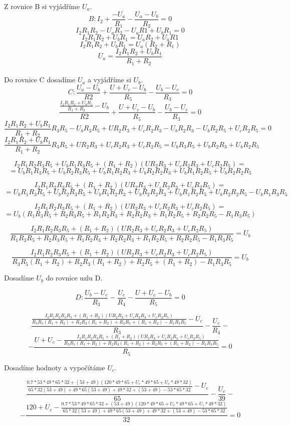 \documentclass[a4paper, 12pt]{article}
\begin{document}
\newpage
Z rovnice B si vyjádříme $U_a$.
$$ B: I_2 + \frac{-U_a}{R_1} - \frac{U_a -U_b}{R_2} = 0 $$
$$ I_2R_1R_2 - U_aR_2 -U_aR1 + U_bR_1 = 0 $$
$$ I_2R_1R_2 + U_bR_1 = U_aR_2 +U_aR1 $$
$$ I_2R_1R_2 + U_bR_1 = U_a(R_2 +R_1) $$
$$ U_a = \frac{I_2R_1R_2 + U_bR_1}{R_1 + R_2} $$
\\
Do rovnice C dosadíme $U_a$ a vyjádříme si $U_b$.
$$ C: \frac{U_a - U_b}{R2} +\frac{U+U_c-U_b}{R_5} - \frac{U_b-U_c}{R_3} = 0 $$
$$ \frac{\frac{I_2R_1R_2 + U_bR_1}{R_1 + R_2} - U_b}{R2} +\frac{U+U_c-U_b}{R_5} - \frac{U_b-U_c}{R_3} = 0 $$
$$ \frac{I_2R_1R_2 + U_bR_1}{R_1 + R_2}R_3R_5 - U_bR_3R_5 +UR_2R_3 + U_cR_2R_3 - U_bR_2R_3 - U_bR_2R_5 + U_cR_2R_5 = 0 $$
$$ \frac{I_2R_1R_2 + U_bR_1}{R_1 + R_2}R_3R_5 +UR_2R_3 + U_cR_2R_3 + U_cR_2R_5 = U_bR_3R_5 + U_bR_2R_3 + U_bR_2R_5 $$

$$ I_2R_1R_2R_3R_5 + U_bR_1R_3R_5 + (R_1 + R_2)(UR_2R_3 + U_cR_2R_3 + U_cR_2R_5) = $$
$$ = U_bR_1R_3R_5 + U_bR_2R_3R_5 + U_bR_1R_2R_3 + U_bR_2R_2R_3 + U_bR_1R_2R_5 + U_bR_2R_2R_5 $$

$$ I_2R_1R_2R_3R_5 + (R_1 + R_2)(UR_2R_3 + U_cR_2R_3 + U_cR_2R_5) = $$
$$ = U_bR_1R_3R_5 + U_bR_2R_3R_5 + U_bR_1R_2R_3 + U_bR_2R_2R_3 + U_bR_1R_2R_5 + U_bR_2R_2R_5 -U_bR_1R_3R_5 $$

$$ I_2R_1R_2R_3R_5 + (R_1 + R_2)(UR_2R_3 + U_cR_2R_3 + U_cR_2R_5) = $$
$$ = U_b (R_1R_3R_5 + R_2R_3R_5 + R_1R_2R_3 + R_2R_2R_3 + R_1R_2R_5 + R_2R_2R_5 -R_1R_3R_5) $$

$$ \frac{I_2R_1R_2R_3R_5 + (R_1 + R_2)(UR_2R_3 + U_cR_2R_3 + U_cR_2R_5)}{R_1R_3R_5 + R_2R_3R_5 + R_1R_2R_3 + R_2R_2R_3 + R_1R_2R_5 + R_2R_2R_5 -R_1R_3R_5} = U_b $$

$$ \frac{I_2R_1R_2R_3R_5 + (R_1 + R_2)(UR_2R_3 + U_cR_2R_3 + U_cR_2R_5)}{R_3R_5 (R_1 + R_2) + R_2R_3 (R_1 +R_2) + R_2R_5 + (R_1 + R_2) -R_1R_3R_5} = U_b $$

\newpage
Dosadíme $U_b$ do rovnice uzlu D.

$$ D: \frac{U_b - U_c}{R_3} - \frac{U_c}{R_4} - \frac{U + U_c - U_b}{R_5}= 0 $$

$$ \frac{\frac{I_2R_1R_2R_3R_5 + (R_1 + R_2)(UR_2R_3 + U_cR_2R_3 + U_cR_2R_5)}{R_3R_5 (R_1 + R_2) + R_2R_3 (R_1 +R_2) + R_2R_5 + (R_1 + R_2) -R_1R_3R_5} - U_c}{R_3} - \frac{U_c}{R_4} - $$
$$ - \frac{U + U_c - \frac{I_2R_1R_2R_3R_5 + (R_1 + R_2)(UR_2R_3 + U_cR_2R_3 + U_cR_2R_5)}{R_3R_5 (R_1 + R_2) + R_2R_3 (R_1 +R_2) + R_2R_5 + (R_1 + R_2) -R_1R_3R_5}}{R_5}= 0 $$

Dosadíme hodnoty a vypočítáme $U_c$.

$$ \frac{\frac{0.7*53*49*65*32 + (53 + 49)(120*49*65 + U_c*49*65 + U_c*49*32)}{65*32 (53 + 49) + 49*65 (53 +49) + 49*32 + (53 + 49) -53*65*32} - U_c}{65} - \frac{U_c}{39} - $$
$$ - \frac{120 + U_c - \frac{0.7*53*49*65*32 + (53 + 49)(120*49*65 + U_c*49*65 + U_c*49*32)}{65*32 (53 + 49) + 49*65 (53 +49) + 49*32 + (53 + 49) -53*65*32}}{32}= 0 $$
\end{document}
